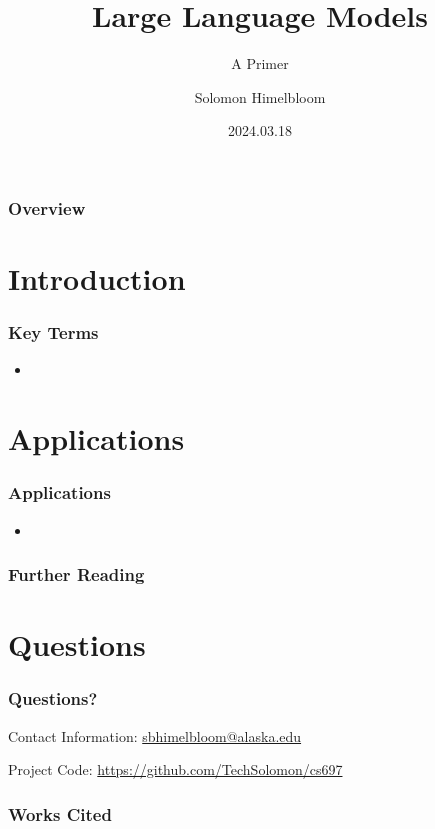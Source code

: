 \documentclass{beamer}
\title{Large Language Models}
\subtitle{A Primer}
\author{Solomon Himelbloom}
\institute{UAF CS}
\date{2024.03.18}
\begin{document}
\frame{\titlepage}

\begin{frame}
\frametitle{Overview}
\tableofcontents
\end{frame}


\section{Introduction}

\begin{frame}
\frametitle{Key Terms}
\begin{itemize}
    \item
\end{itemize}
\end{frame}

\section{Applications}

\begin{frame}
\frametitle{Applications}
\begin{itemize}
    \item
\end{itemize}
\end{frame}

\begin{frame}
\frametitle{Further Reading}
\end{frame}

\section{Questions}

\begin{frame}
\frametitle{Questions?}
\begin{examples}
Contact Information: \href{mailto:sbhimelbloom@alaska.edu}{sbhimelbloom@alaska.edu}

Project Code: \href{https://github.com/TechSolomon/cs697}{https://github.com/TechSolomon/cs697}
\end{examples}
\end{frame}

\begin{frame}
\frametitle{Works Cited}
\end{frame}
\end{document}
